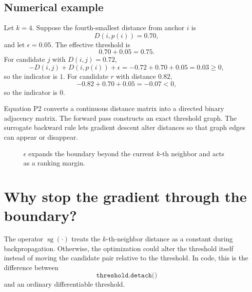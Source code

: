 \documentclass[11pt,oneside,openany]{book}
\theoremstyle{myplain}
\theoremstyle{definition}
\newcommand{\sg}{\operatorname{sg}}
\newcommand{\code}[1]{\texttt{#1}}
\begin{document}
\subsection{Numerical example}

Let $k=4$. Suppose the fourth-smallest distance from anchor $i$ is
\[
D(i,p(i))=0.70,
\]
and let $\epsilon=0.05$. The effective threshold is
\[
0.70+0.05=0.75.
\]
For candidate $j$ with $D(i,j)=0.72$,
\[
-D(i,j)+D(i,p(i))+\epsilon=-0.72+0.70+0.05=0.03\ge0,
\]
so the indicator is $1$. For candidate $r$ with distance $0.82$,
\[
-0.82+0.70+0.05=-0.07<0,
\]
so the indicator is $0$.

\begin{conceptbox}[title=The mature interpretation]
Equation P2 converts a continuous distance matrix into a directed binary adjacency matrix. The forward pass constructs an exact threshold graph. The surrogate backward rule lets gradient descent alter distances so that graph edges can appear or disappear.
\end{conceptbox}


\begin{figure}[H]
\centering
{}
\caption{$\epsilon$ expands the boundary beyond the current $k$-th neighbor and acts as a ranking margin.}
\label{fig:epsilon-neighborhood}
\end{figure}

\section{Why stop the gradient through the boundary?}

The operator $\sg(\cdot)$ treats the $k$-th-neighbor distance as a constant during backpropagation. Otherwise, the optimization could alter the threshold itself instead of moving the candidate pair relative to the threshold. In code, this is the difference between
\[
  \code{threshold.detach()}
\]
and an ordinary differentiable threshold.
\end{document}
